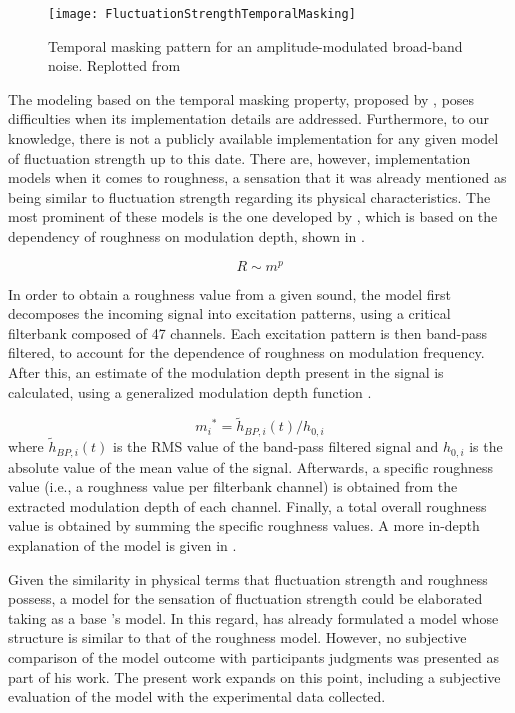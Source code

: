 \documentclass[../main.tex]{subfiles}
\begin{document}
\begin{theoreticalbackground}
\begin{figure}[!ht]
  \centering
  \texttt{[image: FluctuationStrengthTemporalMasking]}
  \caption{Temporal masking pattern for an amplitude-modulated broad-band
    noise. Replotted from~\cite[pp. 255]{Fastl2007Psychoacoustics}}
\label{fig:flucstrenmasking}
\end{figure}

The modeling based on the temporal masking property, proposed by
\citeauthor{Fastl2007Psychoacoustics}, poses difficulties when its
implementation details are addressed. Furthermore, to our knowledge, there is
not a publicly available implementation for any given model of fluctuation
strength up to this date. There are, however, implementation models when it
comes to roughness, a sensation that it was already mentioned as being similar
to fluctuation strength regarding its physical characteristics. The most
prominent of these models is the one developed by
\textcite{daniel1997psychoacoustical}, which is based on the dependency of
roughness on modulation depth, shown in .

\begin{equation}
  R \sim m^p
  \label{eq:R}
\end{equation}

In order to obtain a roughness value from a given sound, the model first
decomposes the incoming signal into excitation patterns, using a critical
filterbank composed of 47 channels. Each excitation pattern is then band-pass
filtered, to account for the dependence of roughness on modulation frequency.
After this, an estimate of the modulation depth present in the signal is
calculated, using a generalized modulation depth function .

\begin{equation}
  {m_i}^* = \tilde{h}_{BP,i}(t)/h_{0,i}
  \label{eq:genmod}
\end{equation}
where $\tilde{h}_{BP,i}(t)$ is the \gls{RMS} value of the band-pass filtered
signal and $h_{0,i}$ is the absolute value of the mean value of the signal.
Afterwards, a specific roughness value (i.e., a roughness value per filterbank
channel) is obtained from the extracted modulation depth of each channel.
Finally, a total overall roughness value is obtained by summing the specific
roughness values. A more in-depth explanation of the model is given in
.

Given the similarity in physical terms that fluctuation strength and roughness
possess, a model for the sensation of fluctuation strength could be elaborated
taking as a base \citeauthor{daniel1997psychoacoustical}'s model. In this
regard, \textcite{Sontacchi1998} has already formulated a model whose structure
is similar to that of the roughness model. However, no subjective comparison of
the model outcome with participants judgments was presented as part of his work.
The present work expands on this point, including a subjective evaluation of the
model with the experimental data collected.


\end{theoreticalbackground}
\end{document}
